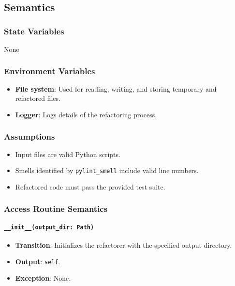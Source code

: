 \documentclass[12pt, titlepage]{article}
\begin{document}
\subsection{Semantics}

\subsubsection{State Variables}

None

\subsubsection{Environment Variables}

\begin{itemize}
\item \textbf{File system}: Used for reading, writing, and storing temporary and refactored files.
\item \textbf{Logger}: Logs details of the refactoring process.
\end{itemize}

\subsubsection{Assumptions}

\begin{itemize}
  \item Input files are valid Python scripts.
  \item Smells identified by \texttt{pylint\_smell} include valid line numbers.
  \item Refactored code must pass the provided test suite.
\end{itemize}

\subsubsection{Access Routine Semantics}

\paragraph{\texttt{\_\_init\_\_(output\_dir: Path)}}
\begin{itemize}
\item \textbf{Transition}: Initializes the refactorer with the specified output directory.
\item \textbf{Output}: \texttt{self}.
\item \textbf{Exception}: None.
\end{itemize}
\end{document}

